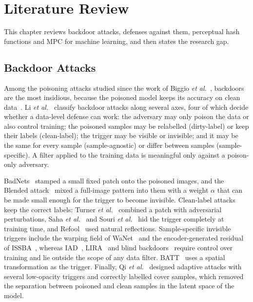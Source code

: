 \chapter{Literature Review}
\label{chap:lr}

This chapter reviews backdoor attacks, defenses against them, perceptual hash
functions and MPC for machine learning, and then states the research gap.

\section{Backdoor Attacks}
\label{sec:lr-attacks}

Among the poisoning attacks studied since the work of Biggio
\emph{et al.}~\cite{biggio2012poisoning}, backdoors are the most insidious,
because the poisoned model keeps its accuracy on clean
data~\cite{goldblum2023dataset}. Li
\emph{et al.}~\cite{li2024backdoorsurvey} classify backdoor attacks along several
axes, four of which decide whether a data-level defense can work: the adversary
may only poison the data or also control training; the poisoned samples may be
relabelled (dirty-label) or keep their labels (clean-label); the trigger may be
visible or invisible; and it may be the same for every sample
(sample-agnostic) or differ between samples (sample-specific). A filter applied
to the training data is meaningful only against a poison-only adversary.

BadNets~\cite{gu2019badnets} stamped a small fixed patch onto the poisoned
images, and the Blended attack~\cite{chen2017blended} mixed a full-image pattern
into them with a weight $\alpha$ that can be made small enough for the trigger to
become invisible. Clean-label attacks keep the correct labels:
Turner \emph{et al.}~\cite{turner2019labelconsistent} combined a patch with
adversarial perturbations, Saha \emph{et al.}~\cite{saha2020hidden} and Souri
\emph{et al.}~\cite{souri2022sleeper} hid the trigger completely at training
time, and Refool~\cite{liu2020refool} used natural reflections. Sample-specific
invisible triggers include the warping field of WaNet~\cite{nguyen2021wanet} and
the encoder-generated residual of ISSBA~\cite{li2021issba}, whereas
IAD~\cite{nguyen2020iad}, LIRA~\cite{doan2021lira} and blind
backdoors~\cite{bagdasaryan2021blind} require control over training and lie
outside the scope of any data filter. BATT~\cite{xu2023batt} uses a spatial
transformation as the trigger. Finally, Qi
\emph{et al.}~\cite{qi2023revisiting} designed adaptive attacks with several
low-opacity triggers and correctly labelled cover samples, which removed the
separation between poisoned and clean samples in the latent space of the model.

